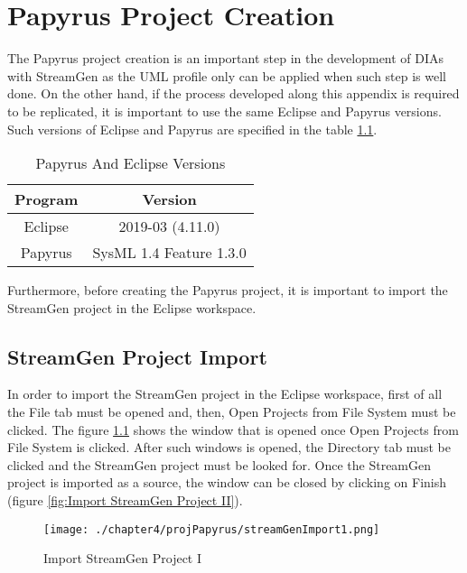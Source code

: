 \chapter{Papyrus Project Creation}
\label{sec:Appendix1}

The Papyrus project creation is an important step in the development of DIAs with StreamGen as the UML profile only can be applied when such step is well done. On the other hand, if the process developed along this appendix is required to be replicated, it is important to use the same Eclipse and Papyrus versions. Such versions of Eclipse and Papyrus are specified in the table \ref{Papyrus And Eclipse Versions}.

\begin{table}[h!]
\centering
	\begin{tabular}{||c|c||} 
	\hline\hline
	Program & Version \\ [1ex] 
	\hline\hline
	Eclipse & 2019-03 (4.11.0)  \\
	\hline
	Papyrus & SysML 1.4 Feature 1.3.0  \\
	\hline\hline
	\end{tabular}
\caption{Papyrus And Eclipse Versions}
\label{Papyrus And Eclipse Versions}
\end{table}

Furthermore, before creating the Papyrus project, it is important to import the StreamGen project in the Eclipse workspace.

\section{StreamGen Project Import}

In order to import the StreamGen project in the Eclipse workspace, first of all the File tab must be opened and, then, Open Projects from File System must be clicked. The figure \ref{fig:Import StreamGen Project I} shows the window that is opened once Open Projects from File System is clicked. After such windows is opened, the Directory tab must be clicked and the StreamGen project must be looked for. Once the StreamGen project is imported as a source, the window can be closed by clicking on Finish (figure \ref{fig:Import StreamGen Project II}).

\begin{figure}
\centering
{\texttt{[image: ./chapter4/projPapyrus/streamGenImport1.png]}}
\caption{Import StreamGen Project I}
\label{fig:Import StreamGen Project I}
\end{figure}

